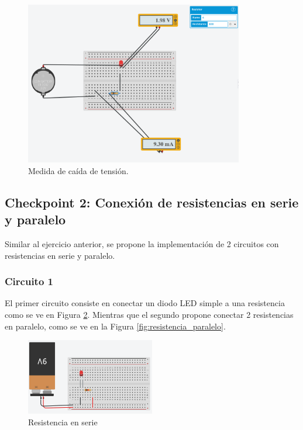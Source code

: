 \documentclass{article}
\begin{document}
\begin{figure}[H]
    \centering
    \includegraphics[width=0.85\textwidth]{./img/ckpt_1_1.png}
    \caption{Medida de ca\'ida de tensión.}
    \label{fig:caida_tension}
\end{figure}

\subsection{Checkpoint 2: Conexión de resistencias en serie y paralelo}

Similar al ejercicio anterior, se propone la implementación de 2 circuitos con resistencias en serie y paralelo.

\subsubsection{Circuito 1}

El primer circuito consiste en conectar un diodo LED simple a una resistencia como se ve en Figura \ref{fig:resistencia_serie}. Mientras que el segundo propone conectar 2 resistencias en paralelo, como se ve en la Figura \ref{fig:resistencia_paralelo}. 

\begin{figure}[H]
    \centering
    \includegraphics[width=0.5\textwidth]{./img/ckpt_2_1.png}
    \caption{Resistencia en serie}
    \label{fig:resistencia_serie}
\end{figure}
\end{document}
